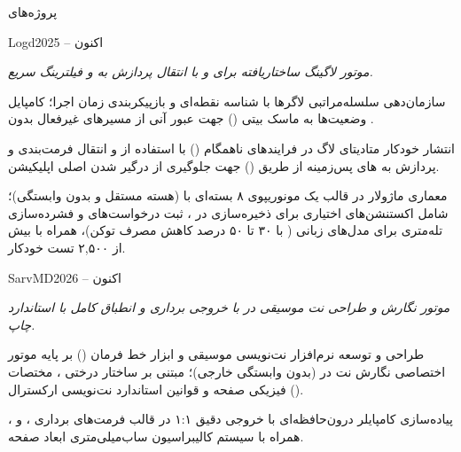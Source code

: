 \documentclass[
	a4paper,
	11pt,
]{resume_fa}
\begin{document}
\begin{rSection}{پروژه‌های }

    \begin{rSubsection}{Logd}{2025 -- اکنون}{}{ \hfill \footnotesize\textcolor{bluegray}{\faClean{\faGithubAlt}~~\textperiodcentered~\faClean{\faCube}~}}
        \item[] {\small\textsl{موتور لاگینگ ساختاریافته برای  و  با انتقال پردازش  به  و فیلترینگ سریع.}}
        \item سازمان‌دهی سلسله‌مراتبی لاگرها با شناسه نقطه‌ای و بازپیکربندی زمان اجرا؛ کامپایل وضعیت‌ها به ماسک بیتی () جهت عبور آنی از مسیرهای غیرفعال بدون .
        \item انتشار خودکار متادیتای لاگ در فرایندهای ناهمگام () با استفاده از  و انتقال فرمت‌بندی و پردازش  به های پس‌زمینه از طریق  () جهت جلوگیری از درگیر شدن  اصلی اپلیکیشن.
        \item معماری ماژولار در قالب یک مونو‌ریپوی ۸ بسته‌ای با  (هسته مستقل و بدون وابستگی)؛ شامل اکستنشن‌های اختیاری برای ذخیره‌سازی در ، ثبت درخواست‌های  و فشرده‌سازی تله‌متری برای مدل‌های زبانی ( با ۳۰ تا ۵۰ درصد کاهش مصرف توکن)، همراه با بیش از ۲,۵۰۰ تست خودکار.
        \\       
    \end{rSubsection}

    \begin{rSubsection}{SarvMD}{2026 -- اکنون}{}{ \hfill \footnotesize\textcolor{bluegray}{\faClean{\faGithubAlt}~~\textperiodcentered~\faClean{\faDesktop}~}}
        \item[] {\small\textsl{موتور نگارش و طراحی نت موسیقی در  با خروجی برداری و انطباق کامل با استاندارد چاپ.}}
        \item طراحی و توسعه نرم‌افزار نت‌نویسی موسیقی و ابزار خط فرمان () بر پایه موتور اختصاصی نگارش نت در  (بدون وابستگی خارجی)؛ مبتنی بر ساختار درختی ، مختصات فیزیکی صفحه و قوانین استاندارد نت‌نویسی ارکسترال ().
        \item پیاده‌سازی کامپایلر درون‌حافظه‌ای با خروجی دقیق ۱:۱ در قالب فرمت‌های برداری ،  و ، همراه با سیستم کالیبراسیون ساب‌میلی‌متری ابعاد صفحه.
        \\       
    \end{rSubsection}


\end{rSection}
\end{document}
